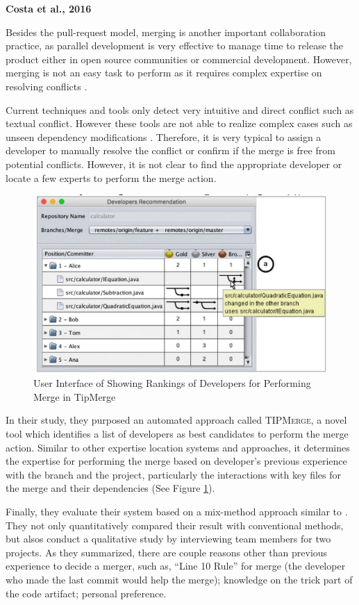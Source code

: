 \textbf{Costa et al., 2016}

Besides the pull-request model, merging is another important collaboration practice, as parallel development is very effective to manage time to release the product either in open source communities or commercial development. However, merging is not an easy task to perform as it requires complex expertise on resolving conflicts \cite{costa2016tipmerge}. 

Current techniques and tools only detect very intuitive and direct conflict such as textual conflict. However these tools are not able to realize complex cases such as unseen dependency modifications \cite{shihab2012effect}. Therefore, it is very typical to assign a developer to manually resolve the conflict or confirm if the merge is free from potential conflicts. However, it is not clear to find the appropriate developer or locate a few experts to perform the merge action.

\begin{figure}
\includegraphics[width = 0.5\columnwidth]{TipMerge.png}
\centering
\caption{User Interface of Showing Rankings of Developers for Performing Merge in TipMerge \cite{costa2016tipmerge}}
\label{TipMerge}
\end{figure}

In their study, they purposed an automated approach called \textsc{TIPMerge}, a novel tool which identifies a list of developers as best candidates to perform the merge action. Similar to other expertise location systems and approaches, it determines the expertise for performing the merge based on developer's previous experience with the branch and the project, particularly the interactions with key files for the merge and their dependencies (See Figure \ref{TipMerge}).

Finally, they evaluate their system based on a mix-method approach similar to \cite{yu2016reviewer}. They not only quantitatively compared their result with conventional methods, but alsos conduct a qualitative study by interviewing team members for two projects. As they summarized, there are couple reasons other than previous experience to decide a merger, such as, ``Line 10 Rule'' for merge (the developer who made the last commit would help the merge); knowledge on the trick part of the code artifact; personal preference.

